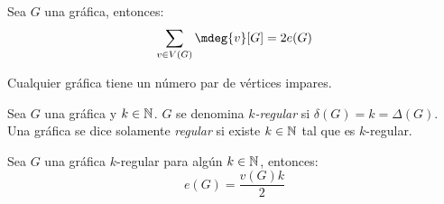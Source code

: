 \begin{theorem}
	Sea $G$ una gráfica, entonces:
	\[ \sum_{v\in V(G)}\mdeg{v}[G] = 2e(G) \]
\end{theorem}
\begin{coll}
	Cualquier gráfica tiene un número par de vértices impares.
\end{coll}
\begin{definition}[Regularidad]
	Sea $G$ una gráfica y $k\in\mathbb{N}^{}$. $G$ se denomina \emph{$k$-regular} si $\delta(G) = k =\Delta(G)$. Una gráfica se dice solamente \emph{regular} si existe $k\in\mathbb{N}^{}$ tal que es $k$-regular.
\end{definition}
\begin{theorem}
	Sea $G$ una gráfica $k$-regular para algún $k\in\mathbb{N}^{}$, entonces:
	\[ e(G) =\dfrac{v(G)k}{2} \]
\end{theorem}
